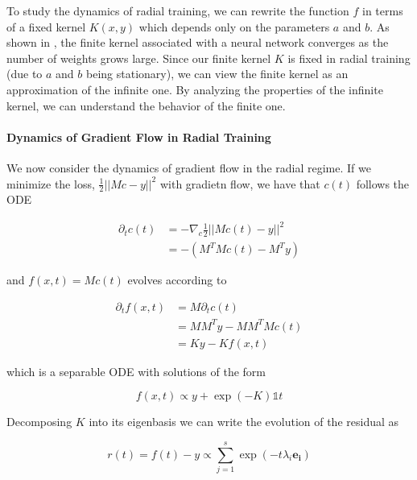 To study the dynamics of radial training, we can rewrite the function $f$ in terms of a fixed kernel $K(x, y)$ which depends only on the parameters $a$ and $b$. As shown in \cite{NTKJacot}, the finite kernel associated with a neural network converges as the number of weights grows large. Since our finite kernel $K$ is fixed in radial training (due to $a$ and $b$ being stationary), we can view the finite kernel as an approximation of the infinite one. By analyzing the properties of the infinite kernel, we can understand the behavior of the finite one.



\paragraph{Dynamics of Gradient Flow in Radial Training}
We now consider the dynamics of gradient flow in the radial regime.  If we minimize the loss, $\frac{1}{2}||Mc - y||^2$ with gradietn flow, we have that $c(t)$ follows the ODE 

\begin{equation}
\begin{aligned}
    \partial_t c(t) &= -\nabla_c \frac{1}{2} ||M c(t) - y||^2\\
                    &= -(M^T M c(t) - M^T y)
\end{aligned}
\end{equation}

and $f(x, t) = Mc(t)$ evolves according to

\begin{equation}
\begin{aligned}
\partial_t f(x, t) &= M \partial_t c(t)\\
                   &= M M^T y - M M^T Mc(t)\\
                   &= Ky - K f(x, t)
\end{aligned}
\end{equation}

which is a separable ODE with solutions of the form

\begin{equation}
    f(x, t) \propto y + \exp{(-K)} \mathds{1}t
\end{equation}

Decomposing $K$ into its eigenbasis we can write the evolution of the residual as

\begin{equation}
    r(t) = f(t) - y \propto \sum_{j=1}^s \exp{(-t\lambda_i \mathbf{e_i})}
\end{equation}

